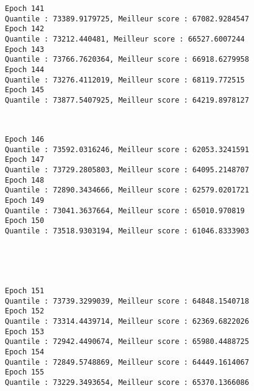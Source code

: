 \documentclass[11pt]{article}
\begin{document}
    \begin{Verbatim}[commandchars=\\\{\}]
Epoch 141
Quantile : 73389.9179725, Meilleur score : 67082.9284547
Epoch 142
Quantile : 73212.440481, Meilleur score : 66527.6007244
Epoch 143
Quantile : 73766.7620364, Meilleur score : 66918.6279958
Epoch 144
Quantile : 73276.4112019, Meilleur score : 68119.772515
Epoch 145
Quantile : 73877.5407925, Meilleur score : 64219.8978127

    \end{Verbatim}

    \begin{center}
    \end{center}
    { \hspace*{\fill} \\}
    
    \begin{Verbatim}[commandchars=\\\{\}]
Epoch 146
Quantile : 73592.0316246, Meilleur score : 62053.3241591
Epoch 147
Quantile : 73729.2805803, Meilleur score : 64095.2148707
Epoch 148
Quantile : 72890.3434666, Meilleur score : 62579.0201721
Epoch 149
Quantile : 73041.3637664, Meilleur score : 65010.970819
Epoch 150
Quantile : 73518.9303194, Meilleur score : 61046.8333903

    \end{Verbatim}

    \begin{center}
    \end{center}
    { \hspace*{\fill} \\}
    
    \begin{center}
    \end{center}
    { \hspace*{\fill} \\}
    
    \begin{Verbatim}[commandchars=\\\{\}]
Epoch 151
Quantile : 73739.3299039, Meilleur score : 64848.1540718
Epoch 152
Quantile : 73314.4439714, Meilleur score : 62369.6822026
Epoch 153
Quantile : 72942.4490674, Meilleur score : 65980.4488725
Epoch 154
Quantile : 72849.5748869, Meilleur score : 64449.1614067
Epoch 155
Quantile : 73229.3493654, Meilleur score : 65370.1366086

    \end{Verbatim}
\end{document}
